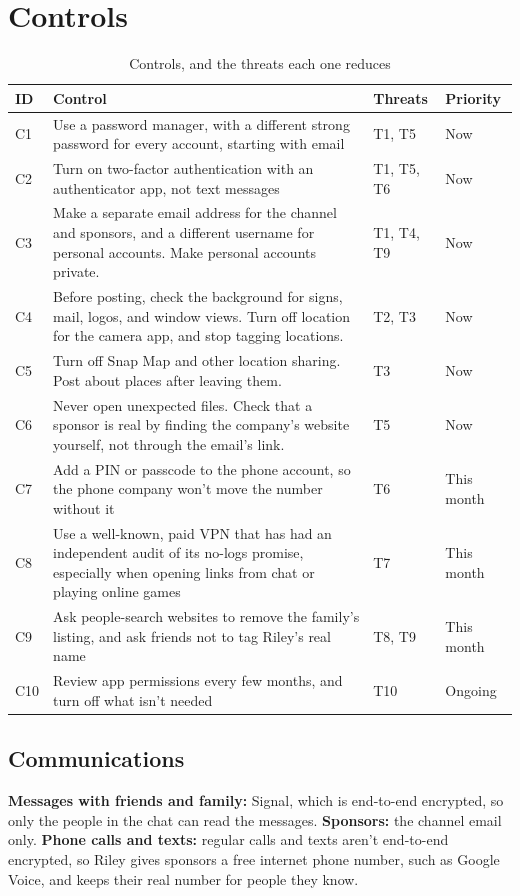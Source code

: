 \documentclass[11pt]{article}
\begin{document}
\section{Controls}
\begin{table}[H]
\caption{Controls, and the threats each one reduces}
\begin{tabular}{|m{}|m{}|m{}|m{}|}
\hline
\textbf{ID} & \textbf{Control} & \textbf{Threats} & \textbf{Priority} \\
\hline
C1 & Use a password manager, with a different strong password for every account, starting with email & T1, T5 & Now \\
\hline
C2 & Turn on two-factor authentication with an authenticator app, not text messages & T1, T5, T6 & Now \\
\hline
C3 & Make a separate email address for the channel and sponsors, and a different username for personal accounts. Make personal accounts private. & T1, T4, T9 & Now \\
\hline
C4 & Before posting, check the background for signs, mail, logos, and window views. Turn off location for the camera app, and stop tagging locations. & T2, T3 & Now \\
\hline
C5 & Turn off Snap Map and other location sharing. Post about places after leaving them. & T3 & Now \\
\hline
C6 & Never open unexpected files. Check that a sponsor is real by finding the company's website yourself, not through the email's link. & T5 & Now \\
\hline
C7 & Add a PIN or passcode to the phone account, so the phone company won't move the number without it & T6 & This month \\
\hline
C8 & Use a well-known, paid VPN that has had an independent audit of its no-logs promise, especially when opening links from chat or playing online games & T7 & This month \\
\hline
C9 & Ask people-search websites to remove the family's listing, and ask friends not to tag Riley's real name & T8, T9 & This month \\
\hline
C10 & Review app permissions every few months, and turn off what isn't needed & T10 & Ongoing
\end{tabular}
\end{table}

\subsection*{Communications}
\textbf{Messages with friends and family:} Signal, which is end-to-end encrypted, so only the people in the chat can read the messages. \textbf{Sponsors:} the channel email only. \textbf{Phone calls and texts:} regular calls and texts aren't end-to-end encrypted, so Riley gives sponsors a free internet phone number, such as Google Voice, and keeps their real number for people they know.
\end{document}
